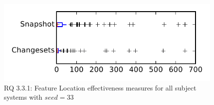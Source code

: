 
\begin{figure}
\centering
\includegraphics[height=0.4\textheight]{figures/flt_seed/rq1_tiny_33}
\caption{RQ 3.3.1: Feature Location effectiveness measures for all subject systems with $seed=33$}
\label{fig:flt_seed:rq1:tiny}
\end{figure}

